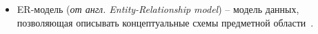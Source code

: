\begin{itemize}[label=]
	\item ER-модель (\textit{от англ. Entity-Relationship model}) -- модель данных, позволяющая описывать концептуальные схемы предметной области~\cite{lit5}.
\end{itemize}

\clearpage
